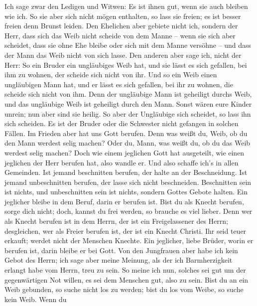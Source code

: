 Ich sage zwar den Ledigen und Witwen: Es ist ihnen gut, wenn sie auch
bleiben wie ich.  So sie aber sich nicht mögen enthalten, so
lass sie freien; es ist besser freien denn Brunst leiden. 
Den Ehelichen aber gebiete nicht ich, sondern der Herr, dass sich das
Weib nicht scheide von dem Manne --  wenn sie sich aber
scheidet, dass sie ohne Ehe bleibe oder sich mit dem Manne versöhne --
und dass der Mann das Weib nicht von sich lasse.  Den
anderen aber sage ich, nicht der Herr: So ein Bruder ein ungläubiges
Weib hat, und sie lässt es sich gefallen, bei ihm zu wohnen, der scheide
sich nicht von ihr.  Und so ein Weib einen ungläubigen Mann
hat, und er lässt es sich gefallen, bei ihr zu wohnen, die scheide sich
nicht von ihm.  Denn der ungläubige Mann ist geheiligt
durchs Weib, und das ungläubige Weib ist geheiligt durch den Mann. Sonst
wären eure Kinder unrein; nun aber sind sie heilig.  So
aber der Ungläubige sich scheidet, so lass ihn sich scheiden. Es ist der
Bruder oder die Schwester nicht gefangen in solchen Fällen. Im Frieden
aber hat uns Gott berufen.  Denn was weißt du, Weib, ob du
den Mann werdest selig machen? Oder du, Mann, was weißt du, ob du das
Weib werdest selig machen?  Doch wie einem jeglichen Gott
hat ausgeteilt, wie einen jeglichen der Herr berufen hat, also wandle
er. Und also schaffe ich's in allen Gemeinden.  Ist jemand
beschnitten berufen, der halte an der Beschneidung. Ist jemand
unbeschnitten berufen, der lasse sich nicht beschneiden. 
Beschnitten sein ist nichts, und unbeschnitten sein ist nichts, sondern
Gottes Gebote halten.  Ein jeglicher bleibe in dem Beruf,
darin er berufen ist.  Bist du als Knecht berufen, sorge
dich nicht; doch, kannst du frei werden, so brauche es viel lieber.
 Denn wer als Knecht berufen ist in dem Herrn, der ist ein
Freigelassener des Herrn; desgleichen, wer als Freier berufen ist, der
ist ein Knecht Christi.  Ihr seid teuer erkauft; werdet
nicht der Menschen Knechte.  Ein jeglicher, liebe Brüder,
worin er berufen ist, darin bleibe er bei Gott.  Von den
Jungfrauen aber habe ich kein Gebot des Herrn; ich sage aber meine
Meinung, als der ich Barmherzigkeit erlangt habe vom Herrn, treu zu
sein.  So meine ich nun, solches sei gut um der
gegenwärtigen Not willen, es sei dem Menschen gut, also zu sein.
 Bist du an ein Weib gebunden, so suche nicht los zu
werden; bist du los vom Weibe, so suche kein Weib.  Wenn du
